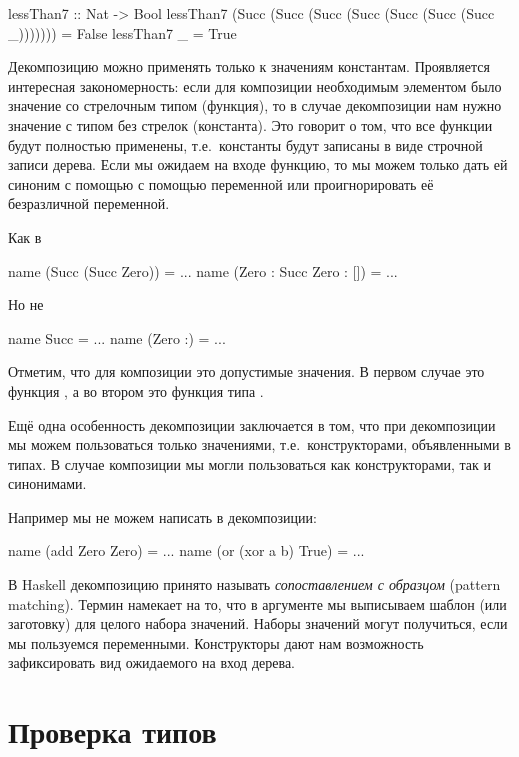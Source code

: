 \begin{code}
lessThan7 :: Nat -> Bool
lessThan7  (Succ (Succ (Succ (Succ (Succ (Succ (Succ _)))))))  = False
lessThan7  _                                                   = True
\end{code}

Декомпозицию можно применять
только к значениям константам. Проявляется интересная закономерность:
если для композиции необходимым элементом было значение со
стрелочным типом (функция), то в случае декомпозиции нам
нужно значение с типом без стрелок (константа). 
Это говорит о том, что все функции будут полностью применены,
т.е.~константы будут записаны в виде строчной записи дерева.
Если мы ожидаем на входе функцию, то мы можем только дать ей
синоним с помощью с помощью переменной или проигнорировать её безразличной
переменной.

Как в

\begin{code}
name  (Succ (Succ Zero))       = ...
name  (Zero : Succ Zero : [])  = ...
\end{code}

Но не

\begin{code}
name  Succ      = ...
name  (Zero :)  = ...
\end{code}

Отметим, что для композиции это допустимые значения. В первом случае
это функция , а во втором это функция типа
\mbox{\In{[Nat] -> [Nat]}}.


Ещё одна особенность декомпозиции заключается в том,
что при декомпозиции мы можем пользоваться только 
значениями, т.е.~конструкторами, объявленными в типах. 
В случае композиции мы могли 
пользоваться как конструкторами, так и синонимами.

Например мы не можем написать в декомпозиции:

\begin{code}
name  (add Zero Zero)      = ...
name  (or (xor a b) True)  = ...
\end{code}

В Haskell декомпозицию принято называть \emph{сопоставлением
с образцом} (pattern matching). Термин намекает на то, что
в аргументе мы выписываем шаблон (или заготовку) для целого
набора значений. Наборы значений могут получиться, если мы пользуемся
переменными. Конструкторы дают нам возможность зафиксировать
вид ожидаемого на вход дерева.

\section{Проверка типов}

